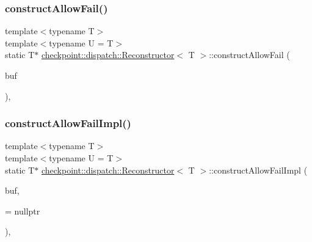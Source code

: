 \mbox{\label{structcheckpoint_1_1dispatch_1_1_reconstructor_afbfa29526948dda3d9d843a377f526fc}} 
\subsubsection{\texorpdfstring{construct\+Allow\+Fail()}{constructAllowFail()}}
{\footnotesize\ttfamily template$<$typename T$>$ \\
template$<$typename U  = T$>$ \\
static T$\ast$ \hyperlink{structcheckpoint_1_1dispatch_1_1_reconstructor}{checkpoint\+::dispatch\+::\+Reconstructor}$<$ T $>$\+::construct\+Allow\+Fail (\begin{DoxyParamCaption}\item[{void $\ast$}]{buf }\end{DoxyParamCaption})\hspace{0.3cm}{\ttfamily [inline]}, {\ttfamily [static]}}

\mbox{\label{structcheckpoint_1_1dispatch_1_1_reconstructor_ac4eac94cd715ae6637f5f5c52bb78584}} 
\subsubsection{\texorpdfstring{construct\+Allow\+Fail\+Impl()}{constructAllowFailImpl()}\hspace{0.1cm}{\footnotesize\ttfamily [1/2]}}
{\footnotesize\ttfamily template$<$typename T$>$ \\
template$<$typename U  = T$>$ \\
static T$\ast$ \hyperlink{structcheckpoint_1_1dispatch_1_1_reconstructor}{checkpoint\+::dispatch\+::\+Reconstructor}$<$ T $>$\+::construct\+Allow\+Fail\+Impl (\begin{DoxyParamCaption}\item[{void $\ast$}]{buf,  }\item[{\hyperlink{structcheckpoint_1_1dispatch_1_1_reconstructor_a6bba60a4c85d06d3e17388dfc5a55554}{is\+Constructible}$<$ U $>$ $\ast$}]{ = {\ttfamily nullptr} }\end{DoxyParamCaption})\hspace{0.3cm}{\ttfamily [inline]}, {\ttfamily [static]}}

